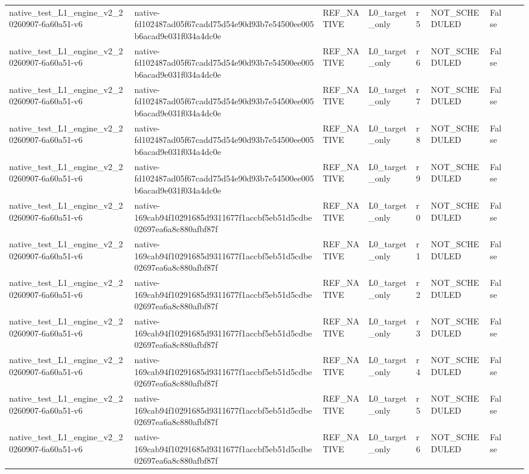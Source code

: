 \begin{tabular}{lllllllll}
native\_test\_L1\_engine\_v2\_20260907-6a60a51-v6 & native-fd102487ad05f67cadd75d54e90d93b7e54500ee005b6acad9e031f034a4dc0e & REF\_NATIVE & L0\_target\_only & r5 & NOT\_SCHEDULED & False &  &  \\
native\_test\_L1\_engine\_v2\_20260907-6a60a51-v6 & native-fd102487ad05f67cadd75d54e90d93b7e54500ee005b6acad9e031f034a4dc0e & REF\_NATIVE & L0\_target\_only & r6 & NOT\_SCHEDULED & False &  &  \\
native\_test\_L1\_engine\_v2\_20260907-6a60a51-v6 & native-fd102487ad05f67cadd75d54e90d93b7e54500ee005b6acad9e031f034a4dc0e & REF\_NATIVE & L0\_target\_only & r7 & NOT\_SCHEDULED & False &  &  \\
native\_test\_L1\_engine\_v2\_20260907-6a60a51-v6 & native-fd102487ad05f67cadd75d54e90d93b7e54500ee005b6acad9e031f034a4dc0e & REF\_NATIVE & L0\_target\_only & r8 & NOT\_SCHEDULED & False &  &  \\
native\_test\_L1\_engine\_v2\_20260907-6a60a51-v6 & native-fd102487ad05f67cadd75d54e90d93b7e54500ee005b6acad9e031f034a4dc0e & REF\_NATIVE & L0\_target\_only & r9 & NOT\_SCHEDULED & False &  &  \\
native\_test\_L1\_engine\_v2\_20260907-6a60a51-v6 & native-169cab94f10291685d9311677f1accbf5eb51d5cdbe02697ea6a8c880afbf87f & REF\_NATIVE & L0\_target\_only & r0 & NOT\_SCHEDULED & False &  &  \\
native\_test\_L1\_engine\_v2\_20260907-6a60a51-v6 & native-169cab94f10291685d9311677f1accbf5eb51d5cdbe02697ea6a8c880afbf87f & REF\_NATIVE & L0\_target\_only & r1 & NOT\_SCHEDULED & False &  &  \\
native\_test\_L1\_engine\_v2\_20260907-6a60a51-v6 & native-169cab94f10291685d9311677f1accbf5eb51d5cdbe02697ea6a8c880afbf87f & REF\_NATIVE & L0\_target\_only & r2 & NOT\_SCHEDULED & False &  &  \\
native\_test\_L1\_engine\_v2\_20260907-6a60a51-v6 & native-169cab94f10291685d9311677f1accbf5eb51d5cdbe02697ea6a8c880afbf87f & REF\_NATIVE & L0\_target\_only & r3 & NOT\_SCHEDULED & False &  &  \\
native\_test\_L1\_engine\_v2\_20260907-6a60a51-v6 & native-169cab94f10291685d9311677f1accbf5eb51d5cdbe02697ea6a8c880afbf87f & REF\_NATIVE & L0\_target\_only & r4 & NOT\_SCHEDULED & False &  &  \\
native\_test\_L1\_engine\_v2\_20260907-6a60a51-v6 & native-169cab94f10291685d9311677f1accbf5eb51d5cdbe02697ea6a8c880afbf87f & REF\_NATIVE & L0\_target\_only & r5 & NOT\_SCHEDULED & False &  &  \\
native\_test\_L1\_engine\_v2\_20260907-6a60a51-v6 & native-169cab94f10291685d9311677f1accbf5eb51d5cdbe02697ea6a8c880afbf87f & REF\_NATIVE & L0\_target\_only & r6 & NOT\_SCHEDULED & False &  &  \\

\end{tabular}
